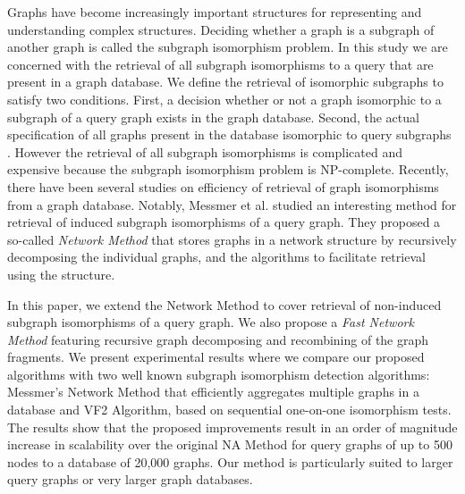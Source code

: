 Graphs have become increasingly important structures for representing and understanding complex structures.
Deciding whether a graph is a subgraph of another graph is called the subgraph isomorphism problem. 
In this study we are concerned with the retrieval of all subgraph isomorphisms to a query that are present in a graph database.
We define the retrieval of isomorphic subgraphs to satisfy two conditions. 
 First, a decision whether or not a graph isomorphic to a subgraph of a query graph exists in the graph database.
Second, the actual specification of all graphs present in the database isomorphic to query subgraphs . 
However the retrieval of all subgraph isomorphisms is complicated and expensive because the subgraph isomorphism problem is NP-complete.
Recently, there have been several studies on efficiency of retrieval of graph isomorphisms from a graph database.
Notably, Messmer et al. studied an interesting method for retrieval of induced subgraph isomorphisms of a query graph.
They proposed a so-called \textit{Network Method} that stores graphs  in a network structure  by recursively decomposing the individual graphs, and the algorithms to facilitate retrieval using the structure.

In this paper, we extend the Network Method to cover retrieval of non-induced subgraph isomorphisms of a query graph. We also propose a  \textit{Fast  Network Method} featuring recursive graph decomposing and recombining of the graph fragments. 
We present experimental results where we compare our proposed algorithms with two well known subgraph isomorphism detection algorithms: Messmer's Network Method that efficiently aggregates multiple graphs in a database
 and VF2 Algorithm, based on sequential one-on-one isomorphism tests. 
The results show that the proposed improvements result in an order of magnitude increase in scalability over the original  NA Method  for query graphs of up to 500 nodes to a database of 20,000 graphs.  
Our method is particularly suited to larger query graphs or very larger graph databases.

